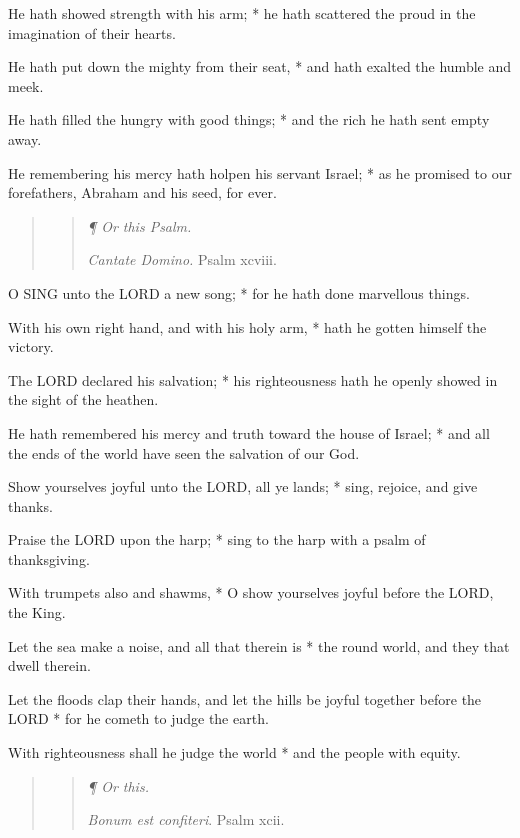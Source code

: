 He hath showed strength with his arm; * he hath scattered
the proud in the imagination of their hearts.

He hath put down the mighty from their seat, * and
hath exalted the humble and meek.

He hath filled the hungry with good things; * and the
rich he hath sent empty away.

He remembering his mercy hath holpen his servant Israel;
* as he promised to our forefathers, Abraham and his seed, for ever.

\begin{quote}

\begin{quote}

\emph{¶ Or this Psalm.}

\emph{Cantate
Domino.} Psalm xcviii.

\end{quote}

\end{quote}

O
SING unto the LORD a new song; * for he hath done
marvellous things.

With his own right hand, and with his holy arm, * hath
he gotten himself the victory.

The LORD declared his salvation;
* his righteousness hath he openly showed in the sight of the heathen.

He hath remembered his mercy and truth toward the house
of Israel; * and all the ends of the world have seen the salvation of
our God.

Show yourselves joyful unto the LORD,
all ye lands; * sing, rejoice, and give thanks.

Praise the LORD upon the harp;
* sing to the harp with a psalm of thanksgiving.

With trumpets also and shawms, * O show yourselves
joyful before the LORD, the King.

Let the sea make a noise, and all that therein is *
the round world, and they that dwell therein.

Let the floods clap their hands, and let the hills
be joyful together before the LORD * for he cometh to judge
the earth.

With righteousness shall he judge the world * and the
people with equity.

\begin{quote}

\begin{quote}

\emph{¶
Or this.}

\emph{Bonum
est confiteri}. Psalm xcii.

\end{quote}

\end{quote}

